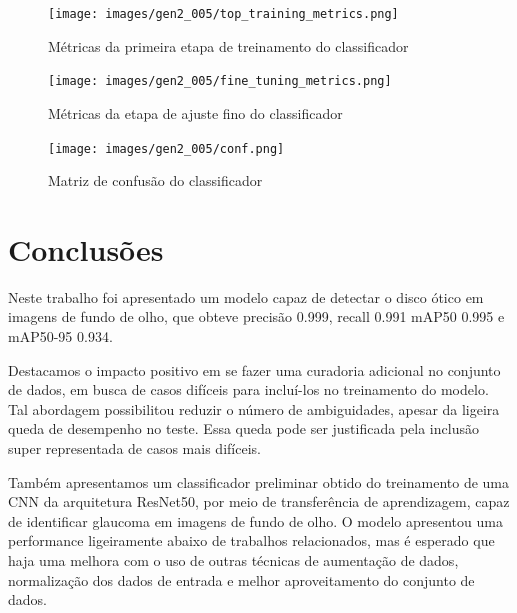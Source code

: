 \documentclass[12pt]{article}
\begin{document}
\begin{figure}[ht]
 \centering
 \texttt{[image: images/gen2\_005/top\_training\_metrics.png]}
 \caption{Métricas da primeira etapa de treinamento do classificador}
 \label{fig:gen2_005_tt_metrics}
\end{figure}

\begin{figure}[h!t]
 \centering
 \texttt{[image: images/gen2\_005/fine\_tuning\_metrics.png]}
 \caption{Métricas da etapa de ajuste fino do classificador}
 \label{fig:gen2_005_ft_metrics}
\end{figure}

\begin{figure}[htb]
 \centering
 \texttt{[image: images/gen2\_005/conf.png]}
 \caption{Matriz de confusão do classificador}
 \label{fig:gen2_005_confusion_matrix}
\end{figure}

\section{Conclusões}
\label{sec:conclusions}

Neste trabalho foi apresentado um modelo capaz de detectar o disco ótico em imagens de fundo de olho, que obteve precisão 0.999, recall 0.991 mAP50 0.995 e mAP50-95 0.934.

Destacamos o impacto positivo em se fazer uma curadoria adicional no conjunto de dados, em busca de casos difíceis para incluí-los no treinamento do modelo. Tal abordagem possibilitou reduzir o número de ambiguidades, apesar da ligeira queda de desempenho no teste. Essa queda pode ser justificada pela inclusão super representada de casos mais difíceis.

Também apresentamos um classificador preliminar obtido do treinamento de uma CNN da arquitetura ResNet50, por meio de transferência de aprendizagem, capaz de identificar glaucoma em imagens de fundo de olho. O modelo apresentou uma performance ligeiramente abaixo de trabalhos relacionados, mas é esperado que haja uma melhora com o uso de outras técnicas de aumentação de dados, normalização dos dados de entrada e melhor aproveitamento do conjunto de dados.

\bigskip


\end{document}
